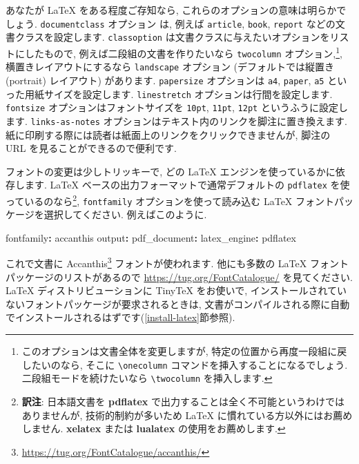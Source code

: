 \documentclass[
  11pt,
  lualatex,ja=standard,jafont=noto]{bxjsreport}
\newenvironment{Shaded}{\begin{snugshade}}{\end{snugshade}}
\newcommand{\AttributeTok}[1]{\textcolor[rgb]{0.77,0.63,0.00}{#1}}
\newcommand{\FunctionTok}[1]{\textcolor[rgb]{0.00,0.00,0.00}{#1}}
\newcommand{\KeywordTok}[1]{\textcolor[rgb]{0.13,0.29,0.53}{\textbf{#1}}}
\renewcommand{\href}[2]{#2\footnote{\url{#1}}}
\begin{document}
あなたが LaTeX をある程度ご存知なら, これらのオプションの意味は明らかでしょう. \texttt{documentclass} オプション は, 例えば \texttt{article}, \texttt{book}, \texttt{report} などの文書クラスを設定します. \texttt{classoption} は文書クラスに与えたいオプションをリストにしたもので, 例えば二段組の文書を作りたいなら \texttt{twocolumn} オプション,\footnote{このオプションは文書全体を変更しますが, 特定の位置から再度一段組に戻したいのなら, そこに \texttt{\textbackslash{}onecolumn} コマンドを挿入することになるでしょう. 二段組モードを続けたいなら \texttt{\textbackslash{}twocolumn} を挿入します.}, 横置きレイアウトにするなら \texttt{landscape} オプション (デフォルトでは縦置き (portrait) レイアウト) があります. \texttt{papersize} オプションは \texttt{a4}, \texttt{paper}, \texttt{a5} といった用紙サイズを設定します. \texttt{linestretch} オプションは行間を設定します. \texttt{fontsize} オプションはフォントサイズを \texttt{10pt}, \texttt{11pt}, \texttt{12pt} というふうに設定します. \texttt{links-as-notes} オプションはテキスト内のリンクを脚注に置き換えます. 紙に印刷する際には読者は紙面上のリンクをクリックできませんが, 脚注の URL を見ることができるので便利です.

フォントの変更は少しトリッキーで, どの LaTeX エンジンを使っているかに依存します. LaTeX ベースの出力フォーマットで通常デフォルトの \texttt{pdflatex} を使っているのなら\footnote{\textbf{訳注}: 日本語文書を \textbf{pdflatex} で出力することは全く不可能というわけではありませんが, 技術的制約が多いため LaTeX に慣れている方以外にはお薦めしません. \textbf{xelatex} または \textbf{lualatex} の使用をお薦めします.}, \texttt{fontfamily} オプションを使って読み込む LaTeX フォントパッケージを選択してください. 例えばこのように.

\begin{Shaded}
\begin{Highlighting}[]
\FunctionTok{fontfamily}\KeywordTok{:}\AttributeTok{ accanthis}
\FunctionTok{output}\KeywordTok{:}
\AttributeTok{  }\FunctionTok{pdf\_document}\KeywordTok{:}
\AttributeTok{    }\FunctionTok{latex\_engine}\KeywordTok{:}\AttributeTok{ pdflatex}
\end{Highlighting}
\end{Shaded}

これで文書に \href{https://tug.org/FontCatalogue/accanthis/}{Accanthis} フォントが使われます. 他にも多数の LaTeX フォントパッケージのリストがあるので \url{https://tug.org/FontCatalogue/} を見てください. LaTeX ディストリビューションに TinyTeX をお使いで, インストールされていないフォントパッケージが要求されるときは, 文書がコンパイルされる際に自動でインストールされるはずです(\ref{install-latex}節参照).
\end{document}
